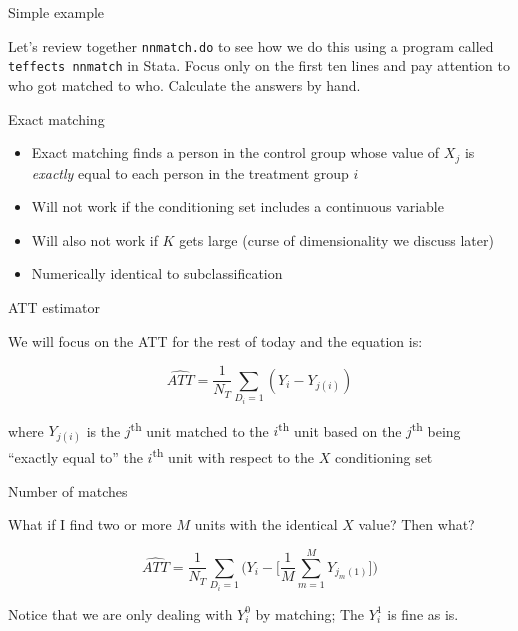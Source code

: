 \documentclass{beamer}
\begin{document}
\begin{frame}{Simple example}

Let's review together \texttt{nnmatch.do} to see how we do this using a program called \texttt{teffects nnmatch} in Stata. Focus only on the first ten lines and pay attention to who got matched to who.  Calculate the answers by hand. 


\end{frame}


\begin{frame}{Exact matching}

\begin{itemize}
\item Exact matching finds a person in the control group whose value of $X_j$ is \emph{exactly} equal to each person in the treatment group $i$
\item Will not work if the conditioning set includes a continuous variable
\item Will also not work if $K$ gets large (curse of dimensionality we discuss later)
\item Numerically identical to subclassification
\end{itemize}

\end{frame}



\begin{frame}{ATT estimator}

We will focus on the ATT for the rest of today and the equation is:

\begin{equation}
\widehat{ATT} = \dfrac{1}{N_T} \sum_{D_i=1}(Y_i - Y_{j(i)})
\label{eq:att_simplematch}
\end{equation}

where $Y_{j(i)}$ is the $j$\textsuperscript{th} unit matched to the $i$\textsuperscript{th} unit based on the $j$\textsuperscript{th} being ``exactly equal to'' the $i$\textsuperscript{th} unit with respect to the $X$ conditioning set

\end{frame}

\begin{frame}{Number of matches}

What if I find two or more $M$ units with the identical $X$ value? Then what?

\begin{equation}
\widehat{ATT} = \dfrac{1}{N_T} \sum_{D_i=1} \bigg ( Y_i - \bigg [\dfrac{1}{M} \sum_{m=1}^M Y_{j_m(1)} \bigg ] \bigg )
\label{eq:att_match}
\end{equation}

\bigskip

Notice that we are only dealing with $Y^0_i$ by matching; The $Y^1_i$ is fine as is.

\end{frame}
\end{document}
